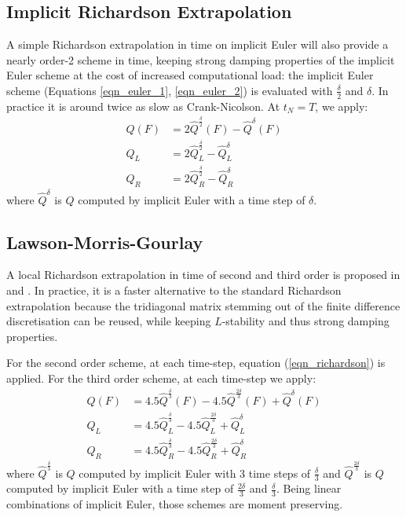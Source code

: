 \documentclass[]{rAMF2e}
\begin{document}
\subsection{Implicit Richardson Extrapolation}
A simple Richardson extrapolation in time \citep{richardson1911approximate} on implicit Euler will also provide a nearly order-2 scheme in time, keeping strong damping properties of the implicit Euler scheme at the cost of increased computational load: the implicit Euler scheme (Equations \ref{eqn_euler_1}, \ref{eqn_euler_2}) is evaluated with $\frac{\delta}{2}$ and $\delta$. In practice it is around twice as slow as Crank-Nicolson. At $t_N=T$, we apply:
\begin{align}\label{eqn_richardson}
Q(F) &= 2 \hat{Q}^{\frac{\delta}{2}}(F) - \hat{Q}^{\delta}(F) \\
Q_L &= 2 \hat{Q}^{\frac{\delta}{2}}_L - \hat{Q}^{\delta}_L\\
Q_R &= 2 \hat{Q}^{\frac{\delta}{2}}_R - \hat{Q}^{\delta}_R
\end{align}
where $\hat{Q}^{\delta}$ is $Q$ computed by implicit Euler with a time step of $\delta$.


\subsection{Lawson-Morris-Gourlay}
A local Richardson extrapolation in time of second and third order is proposed in \citep{lawson1978extrapolation} and \citep{gourlay1980extrapolation}. In practice, it is a faster alternative to the standard Richardson extrapolation because the tridiagonal matrix stemming out of the finite difference discretisation can be reused, while keeping $L$-stability and thus strong damping properties.

For the second order scheme, at each time-step, equation (\ref{eqn_richardson}) is applied.
For the third order scheme, at each time-step we apply:
\begin{align}\label{eqn_lmg3}
Q(F) &= 4.5 \hat{Q}^{\frac{\delta}{3}}(F) - 4.5 \hat{Q}^{\frac{2\delta}{3}}(F)  + \hat{Q}^{\delta}(F)\\
Q_L &= 4.5 \hat{Q}^{\frac{\delta}{3}}_L - 4.5 \hat{Q}^{\frac{2\delta}{3}}_L  + \hat{Q}^{\delta}_L\\
Q_R &= 4.5 \hat{Q}^{\frac{\delta}{3}}_R - 4.5 \hat{Q}^{\frac{2\delta}{3}}_R  + \hat{Q}^{\delta}_R
\end{align}
where $\hat{Q}^{\frac{\delta}{3}}$ is $Q$ computed by implicit Euler with 3 time steps of $\frac{\delta}{3}$ and $\hat{Q}^{\frac{2\delta}{3}}$ is $Q$ computed by implicit Euler with a time step of $\frac{2\delta}{3}$ and $\frac{\delta}{3}$. Being linear combinations of implicit Euler, those schemes are moment preserving.
\end{document}
